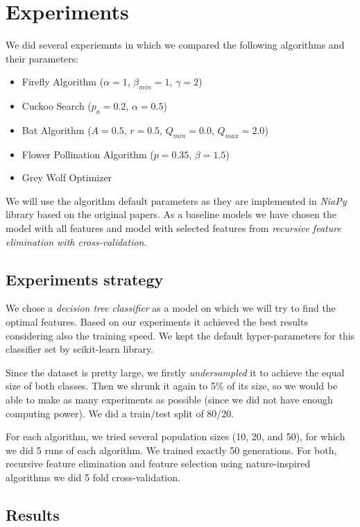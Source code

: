 \documentclass[runningheads]{llncs}
\begin{document}
\section{Experiments}

We did several experiemnts in which we compared the following algorithms and their parameters:

\begin{itemize}
	\item Firefly Algorithm ($\alpha = 1$, $\beta_{min} = 1$, $\gamma = 2$)
	\item Cuckoo Search ($p_a = 0.2$, $\alpha = 0.5$)
	\item Bat Algorithm ($A = 0.5$, $r = 0.5$, $Q_{min} = 0.0$, $Q_{max} = 2.0$)
	\item Flower Pollination Algorithm ($p = 0.35$, $\beta = 1.5$)
	\item Grey Wolf Optimizer
\end{itemize}

We will use the algorithm default parameters as they are implemented in \textit{NiaPy} \cite{NiaPyJOSS2018} library based on the original papers. As a baseline models we have chosen the model with all features and model with selected features from \textit{recursive feature elimination with cross-validation}.

\subsection{Experiments strategy}

We chose a \textit{decision tree classifier} as a model on which we will try to find the optimal features. Based on our experiments it achieved the best results considering also the training speed. We kept the default hyper-parameters for this classifier set by scikit-learn library.

Since the dataset is pretty large, we firstly \textit{undersampled} it to achieve the equal size of both classes. Then we shrunk it again to 5\% of its size, so we would be able to make as many experiments as possible (since we did not have enough computing power). We did a train/test split of 80/20.

For each algorithm, we tried several population sizes (10, 20, and 50), for which we did 5 runs of each algorithm. We trained exactly 50 generations. For both, recursive feature elimination and feature selection using nature-inspired algorithms we did 5 fold cross-validation.

\subsection{Results}
\end{document}

